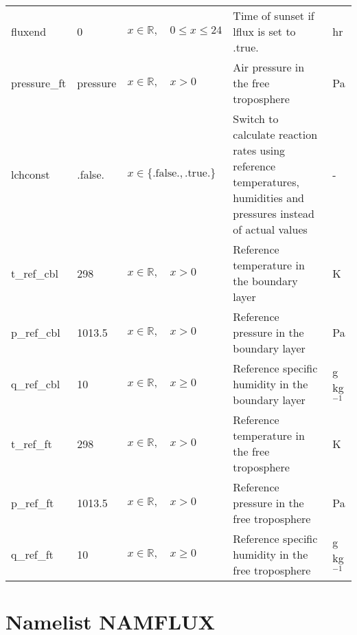 \documentclass[twoside,11pt,fleqn,a4paper,english,openright]{report}
\begin{document}
\begin{center}
\begin{supertabular}{|l|p{1.6cm}|p{4cm}|p{6cm}|l|}
fluxend		&	0			& $x \in \mathbb{R}, \quad 0 \leq x \leq 24$	& Time of sunset if lflux is set to .true.	&	hr\\
pressure\_ft	&	pressure	&	$x \in \mathbb{R}, \quad x > 0$		& Air pressure in the free troposphere	&	Pa\\
lchconst	&	.false.	&	$x\in\{\text{.false.},\text{.true.}\}$	& Switch to calculate reaction rates using reference temperatures, humidities and pressures instead of actual values	& -\\
t\_ref\_cbl	&	298		& $x \in \mathbb{R}, \quad x > 0$				& Reference temperature in the boundary layer	&	K\\
p\_ref\_cbl	&	1013.5	& $x \in \mathbb{R}, \quad x > 0$			& Reference pressure in the boundary layer	&	Pa\\
q\_ref\_cbl	&	10		& $x \in \mathbb{R}, \quad x \geq 0$		& Reference specific humidity in the boundary layer	&	g kg$^{-1}$\\
t\_ref\_ft	&	298		& $x \in \mathbb{R}, \quad x > 0$				& Reference temperature in the free troposphere	&	K\\
p\_ref\_ft	&	1013.5	& $x \in \mathbb{R}, \quad x > 0$			& Reference pressure in the free troposphere	&	Pa\\
q\_ref\_ft	&	10		& $x \in \mathbb{R}, \quad x \geq 0$		& Reference specific humidity in the free troposphere	&	g kg$^{-1}$\\
\end{supertabular}
\end{center}
 
\newpage
\section{Namelist NAMFLUX}\label{par:namflux}
\end{document}

